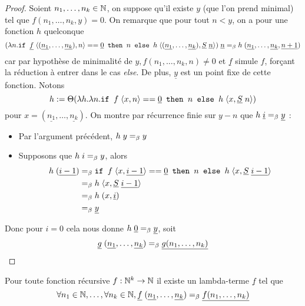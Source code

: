 \begin{proof}
    Soient $n_1,\ldots,n_k\in\mathbb{N}$, on suppose qu'il existe $y$ (que l'on prend minimal) tel que $f(n_1,\ldots,n_k,y) = 0$. On remarque que pour tout $n < y$, on a pour une fonction $h$ quelconque $$(\lambda n.\texttt{if } \underline f\;\langle (\underline{n_1},\ldots,\underline{n_k}),n \rangle == \underline 0 \texttt{ then } n\texttt{ else }h\;\langle (\underline{n_1},\ldots,\underline{n_k}),\underline S\;\underline n \rangle)\;\underline n =_\beta h\;(\underline{n_1},\ldots,\underline{n_k},\underline{n+1})$$ car par hypothèse de minimalité de $y, f(n_1,\ldots,n_k,n) \neq 0$ et $\underline f$ simule $f$, forçant la réduction à entrer dans le cas \textit{else}. De plus, $\underline y$ est un point fixe de cette fonction. Notons $$ h := \Theta(\lambda h.\lambda n.\texttt{if } f\;\langle x,n \rangle == \underline 0 \texttt{ then } n\texttt{ else }h\;\langle x,\underline S\;n \rangle)$$ pour $x = (\underline{n_1},\ldots,\underline{n_k})$. On montre par récurrence finie sur $y-n$ que $h\;\underline i =_\beta \underline y$ :
    \begin{itemize}[label=$\bullet$]
        \item Par l'argument précédent, $h\;y=_\beta y$
        \item Supposons que $h\;i=_\beta y$, alors 
        \begin{align*}
            h\;(\underline{i-1}) &=_\beta \texttt{if } f\;\langle x,\underline{i-1} \rangle == \underline 0 \texttt{ then } n\texttt{ else }h\;\langle x,\underline S\;\underline {i-1} \rangle\\
            &=_\beta h\;\langle x,\underline S\;\underline{i-1}\rangle\\
            &=_\beta h\;(x,\underline i)\\
            &=_\beta \underline y
        \end{align*}
    \end{itemize}

    Donc pour $i = 0$ cela nous donne $h\;\underline 0 =_\beta \underline y$, soit $$\underline g\;(\underline{n_1},\ldots,\underline{n_k}) =_\beta \underline{g(n_1,\ldots,n_k)}$$
\end{proof}

\begin{them}[Simulation]
    Pour toute fonction récursive $f : \mathbb{N}^k\to\mathbb{N}$ il existe un lambda-terme $\underline f$ tel que $$\forall n_1\in\mathbb{N},\ldots,\forall n_k\in\mathbb{N}, \underline f\;(\underline{n_1},\ldots,\underline{n_k})=_\beta \underline{f(n_1,\ldots,n_k)}$$
\end{them}

